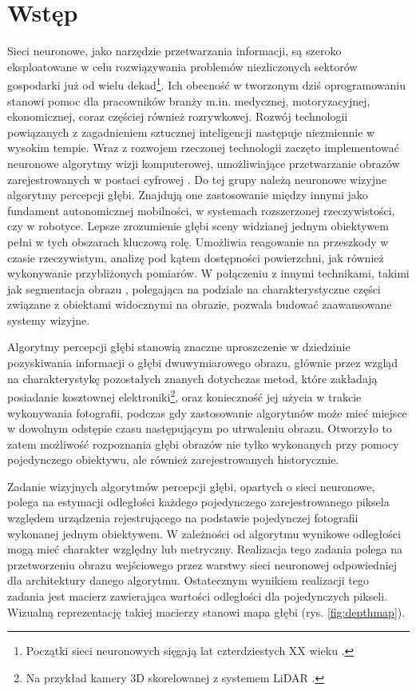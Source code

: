 \chapter{Wstęp}\label{chap:wstęp}

Sieci neuronowe, jako narzędzie przetwarzania informacji, są szeroko eksploatowane w celu rozwiązywania problemów niezliczonych sektorów gospodarki już od wielu dekad\footnote{Początki sieci neuronowych sięgają lat czterdziestych XX wieku \cite{mccullochpitts1943}.}. Ich obecność w tworzonym dziś oprogramowaniu stanowi pomoc dla pracowników branży m.in. medycznej, motoryzacyjnej, ekonomicznej, coraz częściej również rozrywkowej. Rozwój technologii powiązanych z zagadnieniem sztucznej inteligencji następuje niezmiennie w wysokim tempie. Wraz z rozwojem rzeczonej technologii zaczęto implementować neuronowe algorytmy wizji komputerowej, umożliwiające przetwarzanie obrazów zarejestrowanych w postaci cyfrowej \cite{tadeusiewiczflasinski1991}. Do tej grupy należą neuronowe wizyjne algorytmy percepcji głębi. Znajdują one zastosowanie między innymi jako fundament autonomicznej mobilności, w systemach rozszerzonej rzeczywistości, czy w robotyce. Lepsze zrozumienie głębi sceny widzianej jednym obiektywem pełni w tych obszarach kluczową rolę. Umożliwia reagowanie na przeszkody w czasie rzeczywistym, analizę pod kątem dostępności powierzchni, jak również wykonywanie przybliżonych pomiarów. W połączeniu z innymi technikami, takimi jak segmentacja obrazu \cite{minaee2021}, polegająca na podziale na charakterystyczne części związane z obiektami widocznymi na obrazie, pozwala budować zaawansowane systemy wizyjne.

Algorytmy percepcji głębi stanowią znaczne uproszczenie w dziedzinie pozyskiwania informacji o głębi dwuwymiarowego obrazu, głównie przez wzgląd na charakterystykę pozostałych znanych dotychczas metod, które zakładają posiadanie kosztownej elektroniki\footnote{Na przykład kamery 3D skorelowanej z systemem LiDAR \cite{dubik1989}.}, oraz konieczność jej użycia w trakcie wykonywania fotografii, podczas gdy zastosowanie algorytmów może mieć miejsce w dowolnym odstępie czasu następującym po utrwaleniu obrazu. Otworzyło to zatem możliwość rozpoznania głębi obrazów nie tylko wykonanych przy pomocy pojedynczego obiektywu, ale również zarejestrowanych historycznie.

Zadanie wizyjnych algorytmów percepcji głębi, opartych o sieci neuronowe, polega na estymacji odległości każdego pojedynczego zarejestrowanego piksela względem urządzenia rejestrującego na podstawie pojedynczej fotografii wykonanej jednym obiektywem. W zależności od algorytmu wynikowe odległości mogą mieć charakter względny lub metryczny. Realizacja tego zadania polega na przetworzeniu obrazu wejściowego przez warstwy sieci neuronowej odpowiedniej dla architektury danego algorytmu. Ostatecznym wynikiem realizacji tego zadania jest macierz zawierająca wartości odległości dla pojedynczych pikseli. Wizualną reprezentację takiej macierzy stanowi mapa głębi (rys. \ref{fig:depthmap}).

